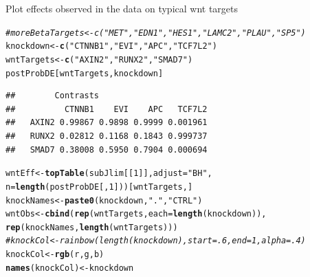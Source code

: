 \documentclass[a4paper]{article}\usepackage[]{graphicx}\usepackage[]{color}
\makeatletter
\newcommand{\hlnum}[1]{\textcolor[rgb]{0.686,0.059,0.569}{#1}}%
\newcommand{\hlstr}[1]{\textcolor[rgb]{0.192,0.494,0.8}{#1}}%
\newcommand{\hlcom}[1]{\textcolor[rgb]{0.678,0.584,0.686}{\textit{#1}}}%
\newcommand{\hlstd}[1]{\textcolor[rgb]{0.345,0.345,0.345}{#1}}%
\newcommand{\hlkwb}[1]{\textcolor[rgb]{0.69,0.353,0.396}{#1}}%
\newcommand{\hlkwc}[1]{\textcolor[rgb]{0.333,0.667,0.333}{#1}}%
\newcommand{\hlkwd}[1]{\textcolor[rgb]{0.737,0.353,0.396}{\textbf{#1}}}%
\newenvironment{kframe}{%
 \def\at@end@of@kframe{}%
 \ifinner\ifhmode%
  \def\at@end@of@kframe{\end{minipage}}%
  \begin{minipage}{\columnwidth}%
 \fi\fi%
 \def\FrameCommand##1{\hskip\@totalleftmargin \hskip-\fboxsep
 \colorbox{shadecolor}{##1}\hskip-\fboxsep
     \hskip-\linewidth \hskip-\@totalleftmargin \hskip\columnwidth}%
 \MakeFramed {\advance\hsize-\width
   \@totalleftmargin\z@ \linewidth\hsize
   \@setminipage}}%
 {\par\unskip\endMakeFramed%
 \at@end@of@kframe}
\newenvironment{knitrout}{}{} %
\makeatother
\begin{document}
Plot effects observed in the data on typical wnt targets
\begin{knitrout}
\color{fgcolor}\begin{kframe}
\begin{alltt}
\hlcom{# moreBetaTargets <- c("MET", "EDN1", "HES1", "LAMC2", "PLAU", "SP5")}
\hlstd{knockdown} \hlkwb{<-} \hlkwd{c}\hlstd{(}\hlstr{"CTNNB1"}\hlstd{,} \hlstr{"EVI"}\hlstd{,} \hlstr{"APC"}\hlstd{,} \hlstr{"TCF7L2"}\hlstd{)}
\hlstd{wntTargets} \hlkwb{<-} \hlkwd{c}\hlstd{(}\hlstr{"AXIN2"}\hlstd{,} \hlstr{"RUNX2"}\hlstd{,} \hlstr{"SMAD7"}\hlstd{)}
\hlstd{postProbDE[wntTargets, knockdown]}
\end{alltt}
\begin{verbatim}
##        Contrasts
##          CTNNB1    EVI    APC   TCF7L2
##   AXIN2 0.99867 0.9898 0.9999 0.001961
##   RUNX2 0.02812 0.1168 0.1843 0.999737
##   SMAD7 0.38008 0.5950 0.7904 0.000694
\end{verbatim}
\begin{alltt}
\hlstd{wntEff} \hlkwb{<-} \hlkwd{topTable}\hlstd{(subJlim[[}\hlnum{1}\hlstd{]],} \hlkwc{adjust}\hlstd{=}\hlstr{"BH"}\hlstd{,}
                     \hlkwc{n}\hlstd{=}\hlkwd{length}\hlstd{(postProbDE[,}\hlnum{1}\hlstd{]))[wntTargets,]}
\hlstd{knockNames} \hlkwb{<-} \hlkwd{paste0}\hlstd{(knockdown,}\hlstr{"."}\hlstd{,}\hlstr{"CTRL"}\hlstd{)}
\hlstd{wntObs} \hlkwb{<-} \hlkwd{cbind}\hlstd{(}\hlkwd{rep}\hlstd{(wntTargets,} \hlkwc{each}\hlstd{=}\hlkwd{length}\hlstd{(knockdown)),}
                \hlkwd{rep}\hlstd{(knockNames,} \hlkwd{length}\hlstd{(wntTargets)) )}
\hlcom{# knockCol <- rainbow(length(knockdown), start=.6, end=1, alpha = .4)}
\hlstd{knockCol} \hlkwb{<-} \hlkwd{rgb}\hlstd{(r,g,b)}
\hlkwd{names}\hlstd{(knockCol)} \hlkwb{<-} \hlstd{knockdown}
\end{alltt}
\end{kframe}
\end{knitrout}
\end{document}
